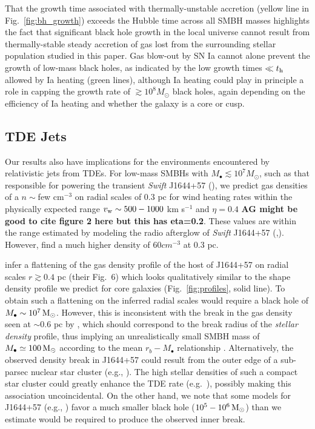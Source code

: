 \documentclass[usenatbib,fleqn]{mn2e}
\newcommand{\Mbh}[1][]{M_{\bullet#1}}
\begin{document}
That the growth time associated with thermally-unstable accretion
(yellow line in Fig.~\ref{fig:bh_growth}) exceeds the Hubble time
across all SMBH masses highlights the fact that significant black hole
growth in the local universe cannot result from thermally-stable
steady accretion of gas lost from the surrounding stellar population
studied in this paper.  Gas blow-out by SN Ia cannot alone prevent the
growth of low-mass black holes, as indicated by the low growth times
$\ll t_{\rm h}$ allowed by Ia heating (green lines), although Ia
heating could play in principle a role in capping the growth rate of
$\gtrsim 10^{8}M_{\odot}$ black holes, again depending on the
efficiency of Ia heating and whether the galaxy is a core or cusp.


\subsection{TDE Jets}
\label{sec:TDE}

Our results also have implications for the environments encountered by
relativistic jets from TDEs.  For low-mass SMBHs with $M_{\bullet}
\lesssim 10^{7}M_{\odot}$, such as that responsible for powering the
transient {\it Swift} J1644+57 (\citealt{Bloom+11}), we predict gas
densities of a $n \sim $few cm$^{-3}$ on radial scales of 0.3 pc for
wind heating rates within the physically expected range $v_{\rm w}
\sim 500-1000$ km s$^{-1}$ and $\eta=0.4$ {\bf AG might be good to
  cite figure 2 here but this has eta=0.2}.  These values are within
the range estimated by modeling the radio afterglow of {\it Swift}
J1644+57 (\citealt{Metzger+12},\citealt{BergerZauderer+:2012a}). However,
\citet{Mimica+2015} find a much higher density of $60 cm^{-3}$ at 0.3 pc. 

\citet{BergerZauderer+:2012a} infer a flattening of the gas density
profile of the host of J1644+57 on radial scales $r \gtrsim 0.4$ pc
(their Fig.~6) which looks qualitatively similar to the shape density
profile we predict for core galaxies (Fig.~\ref{fig:profiles}, solid
line).  To obtain such a flattening on the inferred radial scales
would require a black hole of $\Mbh\sim 10^7 \Msun$.  However, this is
inconsistent with the break in the gas density seen at $\sim 0.6$ pc
by \citet{BergerZauderer+:2012a}, which should correspond to the break
radius of the {\it stellar density} profile, thus implying an
unrealistically small SMBH mass of $\Mbh\simeq 100\Msun$ according to
the mean $r_b-M_{\bullet}$ relationship \citep{LauerFaber+:2007a}.
Alternatively, the observed density break in J1644+57 could result
from the outer edge of a sub-parsec nuclear star cluster (e.g.,
\citealt{Carson+15}).  The high stellar densities of such a compact
star cluster could greatly enhance the TDE rate
(e.g.~\citealt{Stone&Metzger15}), possibly making this association
uncoincidental.  On the other hand, we note that some models for
J1644+57 (e.g., \citealt{Tchekhovskoy+2014}) favor a much smaller
black hole ($10^5-10^6 \,{\rm M_\odot}$) than we estimate would be required to
produce the observed inner break.
\end{document}
